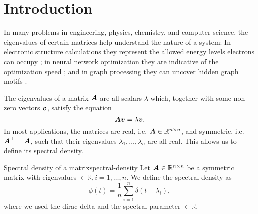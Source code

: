 \chapter{Introduction}
\label{chp:1-introduction}

In many problems in engineering, physics, chemistry, and computer science, 
the eigenvalues of certain matrices help understand the nature of a system:
In electronic structure calculations they represent the allowed energy levels 
electrons can occupy \cite{ducastelle1970charge, haydock1972electronic, lin2017randomized};
in neural network optimization they are indicative of the optimization speed \cite{ghorbani2019investigation,chen2021slq,adepu2021hessian};
and in graph processing they can uncover hidden graph motifs \cite{kruzick2018graph,huang2021kernels,patane2022filter}.\\

The eigenvalues of a matrix $\boldsymbol{A}$ are all scalars $\lambda$ which, together
with some non-zero vectors $\boldsymbol{v}$, satisfy the equation
\begin{equation}
    \boldsymbol{A} \boldsymbol{v} = \lambda \boldsymbol{v}.
    \label{equ:1-introduction-eigenvalue}
\end{equation}
In most applications, the matrices are real, i.e. $\boldsymbol{A} \in \mathbb{R}^{n \times n}$,
and symmetric, i.e. $\boldsymbol{A}^{\top} = \boldsymbol{A}$, such that their eigenvalues 
$\lambda_1, \dots, \lambda_n$ are all real. This allows us to define its
spectral density.

\begin{definition}{Spectral density of a matrix}{spectral-density}
    Let $\boldsymbol{A} \in \mathbb{R}^{n \times n}$ be a symmetric matrix with \glspl{eigenvalue}
    $\in \mathbb{R}, i=1, \dots, n$. We define the \gls{spectral-density} as
    \begin{equation}
        \phi(t) = \frac{1}{n} \sum_{i=1}^{n} \delta(t - \lambda_i),
        \label{equ:1-introduction-def-spectral-density}
    \end{equation}
    where we used the \gls{dirac-delta} \cite[Chapter~15]{dirac1947quantum}
    and the \gls{spectral-parameter} $\in \mathbb{R}$.
\end{definition}

